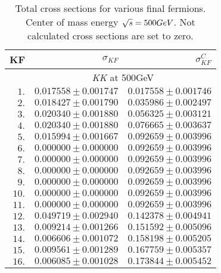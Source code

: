 \documentclass[12pt]{article}
\begin{document}
 
\begin{table}[!ht]
\centering
\caption{\footnotesize\sf
Total cross sections for various final fermions.                                
Center of mass energy $\protect\sqrt{s}=500 GeV$.                               
Not calculated cross sections are set to zero.                                  
}
\begin{tabular}                                                                                          {||r|r|r||}
\hline\hline
KF                              &
$\sigma_{KF}$                   &
$\sigma_{KF}^C$                 
\\
\hline
& \multicolumn{ 2}{c||}{
      {\sl KK} at 500GeV                                                              }
\\
\hline
$        1.$ & $  0.017558\pm0.001747$ & $  0.017558\pm0.001746$
\\
$        2.$ & $  0.018427\pm0.001790$ & $  0.035986\pm0.002497$
\\
$        3.$ & $  0.020340\pm0.001880$ & $  0.056325\pm0.003121$
\\
$        4.$ & $  0.020340\pm0.001880$ & $  0.076665\pm0.003637$
\\
$        5.$ & $  0.015994\pm0.001667$ & $  0.092659\pm0.003996$
\\
$        6.$ & $  0.000000\pm0.000000$ & $  0.092659\pm0.003996$
\\
$        7.$ & $  0.000000\pm0.000000$ & $  0.092659\pm0.003996$
\\
$        8.$ & $  0.000000\pm0.000000$ & $  0.092659\pm0.003996$
\\
$        9.$ & $  0.000000\pm0.000000$ & $  0.092659\pm0.003996$
\\
$       10.$ & $  0.000000\pm0.000000$ & $  0.092659\pm0.003996$
\\
$       11.$ & $  0.000000\pm0.000000$ & $  0.092659\pm0.003996$
\\
$       12.$ & $  0.049719\pm0.002940$ & $  0.142378\pm0.004941$
\\
$       13.$ & $  0.009214\pm0.001266$ & $  0.151592\pm0.005096$
\\
$       14.$ & $  0.006606\pm0.001072$ & $  0.158198\pm0.005205$
\\
$       15.$ & $  0.009561\pm0.001289$ & $  0.167759\pm0.005357$
\\
$       16.$ & $  0.006085\pm0.001028$ & $  0.173844\pm0.005452$
\\
\hline\hline
\end{tabular}
\end{table}
\end{document}
